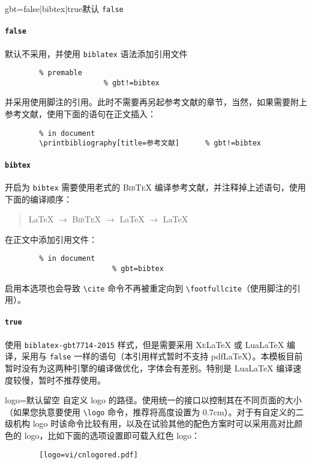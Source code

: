 \documentclass[a4paper,12pt]{article}
\begin{document}
\begin{CJK}{UTF8}{song}
\begin{docKey*}[SJTUBeamermin]{gbt}{=false|bibtex|true}{默认 \texttt{false}}
    \paragraph{\texttt{false}} 默认不采用，并使用 \verb"biblatex" 语法添加引用文件
    \begin{verbatim}
        % premable
                       % gbt!=bibtex
    \end{verbatim}
    并采用使用脚注的引用。此时不需要再另起参考文献的章节，当然，如果需要附上参考文献，使用下面的语句在正文插入：
    \begin{verbatim}
        % in document
        \printbibliography[title=参考文献]      % gbt!=bibtex
    \end{verbatim}
    \paragraph{\texttt{bibtex}} 开启为 \verb"bibtex" 需要使用老式的 \textsc{Bib\TeX{}} 编译参考文献，并注释掉上述语句，使用下面的编译顺序：
    \begin{quotation}
        \LaTeX{} $\rightarrow$ \textsc{Bib\TeX{}} $\rightarrow$ \LaTeX{} $\rightarrow$ \LaTeX{}
    \end{quotation}
    在正文中添加引用文件：
    \begin{verbatim}
        % in document
                         % gbt=bibtex
    \end{verbatim}
    启用本选项也会导致 \verb"\cite" 命令不再被重定向到 \verb"\footfullcite"（使用脚注的引用）。
    \paragraph{\texttt{true}} 使用 \verb"biblatex-gbt7714-2015" 样式，但是需要采用 \textsc{Xe}\LaTeX{} 或 Lua\LaTeX{} 编译，采用与 \verb"false" 一样的语句（本引用样式暂时不支持 pdf\LaTeX{}）。本模板目前暂时没有为这两种引擎的编译做优化，字体会有差别。特别是 Lua\LaTeX{} 编译速度较慢，暂时不推荐使用。 
\end{docKey*}

\begin{docKey*}[SJTUBeamermin]{logo}{=}{默认留空}
    自定义 logo 的路径。使用统一的接口以控制其在不同页面的大小（如果您执意要使用 \verb"\logo" 命令，推荐将高度设置为 0.7cm）。对于有自定义的二级机构 logo 时该命令比较有用，以及在试验其他的配色方案时可以采用高对比颜色的 logo，比如下面的选项设置即可载入红色 logo：
    \begin{verbatim}
        [logo=vi/cnlogored.pdf]
    \end{verbatim}
\end{docKey*}


\end{CJK}
\end{document}
